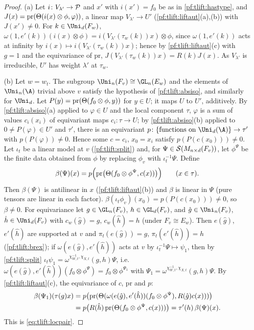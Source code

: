 \begin{proof}
(a) Let $i\colon V_{\lambda'}\to\mathcal{P}$ and $x'$ with $i(x')=f_0$ be as in \cref{pf:tlift:hastype}, and
$J(x)=\mathrm{pr}(\Theta(i(x)\otimes\phi,\varphi))$, a linear map $V_{\lambda'}\to U'$ (\cref{pf:tlift:liftaut}(a),(b)) with $J(x')\ne0$. For
$k\in\Uni_d(F_w)$, $\omega(1,e'(k))(i(x)\otimes\phi)=i(V_{\lambda'}(\tau_w(k))x)\otimes\phi$, since $\omega(1,e'(k))$ acts at infinity by
$i(x)\mapsto i(V_{\lambda'}(\tau_w(k))x)$; hence by \cref{pf:tlift:liftaut}(c) with $g=1$ and the equivariance of $\mathrm{pr}$,
$J(V_{\lambda'}(\tau_w(k))x)=R(k)J(x)$. As $V_{\lambda'}$ is irreducible, $U'$ has weight $\lambda'$ at $\tau_w$.

(b) Let $w=w_t$. The subgroup $\Uni_n(F_v)\cong\GL_n(E_w)$ and the elements of $\Uni_n(\A)$ trivial above $v$ satisfy the
hypothesis of \cref{pf:tlift:absiso}, and similarly for $\Uni_d$. Let $P(y)=\mathrm{pr}(\Theta(f_0\otimes\phi,y))$ for $y\in U$; it maps
$U$ to $U'$, additively. By \cref{pf:tlift:absiso}(a) applied to $\varphi\in U$ and the local component $\tau$, $\varphi$ is a sum of
values $c_i(x_i)$ of equivariant maps $c_i\colon\tau\to U$; by \cref{pf:tlift:absiso}(b) applied to $0\ne P(\varphi)\in U'$ and
$\tau'$, there is an equivariant $p\colon\{\text{functions on }\Uni_d(\A)\}\to\tau'$ with $p(P(\varphi))\ne0$. Hence some
$c=c_i$, $x_0=x_i$ satisfy $p(P(c(x_0)))\ne0$. Let $\iota_t$ be a linear model at $v$ (\cref{pf:tlift:split}) and, for
$\Psi\in\mathcal{S}(M_{n\times d}(F_v))$, let $\phi^\Psi$ be the finite data obtained from $\phi$ by replacing $\phi_v$ with $\iota_t^{-1}\Psi$.
Define
\[
  \beta(\Psi)(x)=p\Bigl(\mathrm{pr}\bigl(\Theta(f_0\otimes\phi^\Psi,c(x))\bigr)\Bigr)\qquad(x\in\tau).
\]
Then $\beta(\Psi)$ is antilinear in $x$ (\cref{pf:tlift:liftaut}(b)) and $\beta$ is linear in $\Psi$ (pure tensors are linear in
each factor). $\beta(\iota_t\phi_v)(x_0)=p(P(c(x_0)))\ne0$, so $\beta\ne0$. For equivariance let $g\in\GL_n(F_v)$, $h\in\GL_d(F_v)$, and
$\hat g\in\Uni_n(F_v)$, $\hat h\in\Uni_d(F_v)$ with $c_w(\hat g)=g$, $c_w(\hat h)=h$ (under $F_v\cong E_w$). Then $e(\hat g)$, $e'(\hat h)$
are supported at $v$ and $\pi_t(e(\hat g))=g$, $\pi_t(e'(\hat h))=h$ (\cref{pf:tlift:brex}); if $\omega(e(\hat g),e'(\hat h))$ acts at
$v$ by $\iota_t^{-1}\Psi\mapsto\psi_1$, then by \cref{pf:tlift:split} $\iota_t\psi_1=\omega^{\chi_{W,t}^{-1},\chi_{X,t}}(g,h)\Psi$, i.e.
$\omega(e(\hat g),e'(\hat h))(f_0\otimes\phi^\Psi)=f_0\otimes\phi^{\Psi_1}$ with $\Psi_1=\omega^{\chi_{W,t}^{-1},\chi_{X,t}}(g,h)\Psi$. By
\cref{pf:tlift:liftaut}(c), the equivariance of $c$, $\mathrm{pr}$ and $p$:
\begin{align*}
  \beta(\Psi_1)(\tau(g)x)&=p\bigl(\mathrm{pr}(\Theta(\omega(e(\hat g),e'(\hat h))(f_0\otimes\phi^\Psi),R(\hat g)c(x)))\bigr)\\
  &=p\bigl(R(\hat h)\,\mathrm{pr}(\Theta(f_0\otimes\phi^\Psi,c(x)))\bigr)=\tau'(h)\,\beta(\Psi)(x).
\end{align*}
This is \eqref{eq:tlift:locpair}.
\end{proof}

